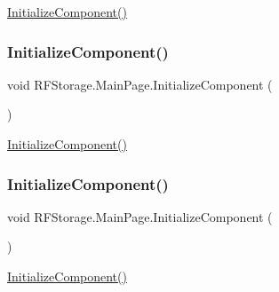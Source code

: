 \mbox{\hyperlink{class_r_f_storage_1_1_main_page_a44b868cd44ff5ee9dbe953b104a1f9a1}{Initialize\+Component()}} 

\mbox{\label{class_r_f_storage_1_1_main_page_a44b868cd44ff5ee9dbe953b104a1f9a1}} 
\subsubsection{\texorpdfstring{InitializeComponent()}{InitializeComponent()}\hspace{0.1cm}{\footnotesize\ttfamily [4/8]}}
{\footnotesize\ttfamily void R\+F\+Storage.\+Main\+Page.\+Initialize\+Component (\begin{DoxyParamCaption}{ }\end{DoxyParamCaption})}



\mbox{\hyperlink{class_r_f_storage_1_1_main_page_a44b868cd44ff5ee9dbe953b104a1f9a1}{Initialize\+Component()}} 

\mbox{\label{class_r_f_storage_1_1_main_page_a44b868cd44ff5ee9dbe953b104a1f9a1}} 
\subsubsection{\texorpdfstring{InitializeComponent()}{InitializeComponent()}\hspace{0.1cm}{\footnotesize\ttfamily [5/8]}}
{\footnotesize\ttfamily void R\+F\+Storage.\+Main\+Page.\+Initialize\+Component (\begin{DoxyParamCaption}{ }\end{DoxyParamCaption})}



\mbox{\hyperlink{class_r_f_storage_1_1_main_page_a44b868cd44ff5ee9dbe953b104a1f9a1}{Initialize\+Component()}} 

\mbox{\label{class_r_f_storage_1_1_main_page_a44b868cd44ff5ee9dbe953b104a1f9a1}} 
